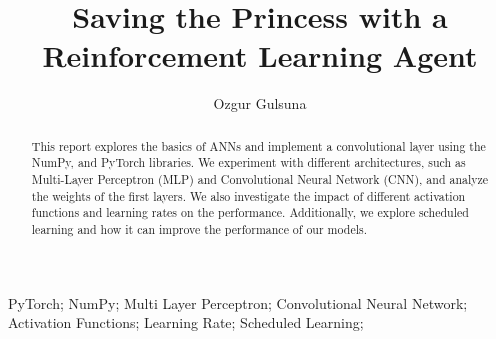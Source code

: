 \documentclass[3p,times,procedia]{elsarticle}
\begin{document}
\begin{frontmatter}





\title{\textbf{Saving the Princess with a \\ Reinforcement Learning Agent}}




\author[]{Ozgur Gulsuna} 

\address[]{Middle East Technical University, Electrical and Electronics Engineering, Ankara, Turkey}

\begin{abstract}
This report explores the basics of ANNs and implement a convolutional layer using the NumPy, and PyTorch libraries. We experiment with different architectures, such as Multi-Layer Perceptron (MLP) and Convolutional Neural Network (CNN), and analyze the weights of the first layers.
We also investigate the impact of different activation functions and learning rates on the performance. Additionally, we explore scheduled learning and how it can improve the performance of our models.
\end{abstract}

\begin{keyword}
PyTorch;
 NumPy;
 Multi Layer Perceptron;
 Convolutional Neural Network;
 Activation Functions;
 Learning Rate;
 Scheduled Learning;
\end{keyword}

\end{frontmatter}
\end{document}
